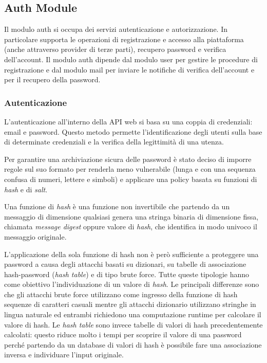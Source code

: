 \subsection{Auth Module}
Il modulo auth si occupa dei servizi autenticazione e autorizzazione.
In particolare supporta le operazioni di registrazione e accesso alla piattaforma (anche attraverso provider di terze parti), recupero password e verifica dell'account.
Il modulo auth dipende dal modulo user per gestire le procedure di registrazione e
dal modulo mail per inviare le notifiche di verifica dell'account e per il recupero della password.

\subsubsection{Autenticazione}
L'autenticazione all'interno della API web si basa su una coppia di credenziali: email e password.
Questo metodo permette l'identificazione degli utenti sulla base di determinate credenziali e la
verifica della legittimità di una utenza.

Per garantire una archiviazione sicura delle password è stato deciso di imporre regole sul suo formato per renderla meno vulnerabile (lunga e con una sequenza confusa di numeri, lettere e simboli)
e applicare una policy basata su funzioni di \textit{hash} e di \textit{salt}.

Una funzione di \textit{hash} è una funzione non invertibile che partendo da un messaggio di dimensione qualsiasi genera una stringa
binaria di dimensione fissa, chiamata \textit{message digest} oppure valore di \textit{hash}, che identifica in modo univoco il messaggio originale.

L'applicazione della sola funzione di hash non è però sufficiente a proteggere una password a causa degli attacchi basati su dizionari, su tabelle di associazione
hash-password (\textit{hash table}) e di tipo brute force. Tutte queste tipologie hanno come obiettivo l'individuazione di un valore di \textit{hash}.
Le principali differenze sono che gli attacchi brute force utilizzano come ingresso della funzione di hash sequenze di caratteri casuali mentre gli attacchi dizionario utilizzano
stringhe in lingua naturale ed entrambi richiedono una computazione runtime per calcolare il valore di hash.
Le \textit{hash table} sono invece tabelle di valori di hash precedentemente calcolati: questo riduce molto i tempi per scoprire il valore di una password
perché partendo da un database di valori di hash è possibile fare una associazione inversa e individuare l'input originale.

